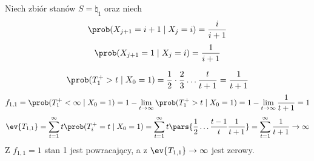 \begin{example}
	Niech zbiór stanów \(S = \natural_1\) oraz niech
	\[
		\prob(X_{j + 1} = i + 1 \mid X_j = i) = \frac{i}{i+1}
	\]
	\[
		\prob(X_{j + 1} = 1 \mid X_j = i) = \frac{1}{i+1}
	\]
	\begin{center}
	\end{center}

	\[
		\prob(T_1^+ > t \mid X_0 = 1) = \frac{1}{2} \cdot \frac{2}{3} \dots \frac{t}{t+1} = \frac{1}{t+1}
	\]
	\[
		f_{1, 1} = \prob(T_1^+ < \infty \mid X_0 = 1) = 1 - \lim_{t \to \infty} \prob(T_1^+ > t \mid X_0 = 1) = 1 - \lim_{t \to \infty} \frac{1}{t+1} = 1
	\]
	\[
		\ev{T_{1, 1}} = \sum_{t = 1}^\infty t \prob(T_i^+ = t \mid X_0 = 1) = \sum_{t = 1}^\infty t \pars{\frac{1}{2} \dots \frac{t-1}{t} \frac{1}{t+1}} = \sum_{t = 1}^\infty \frac{1}{t+1} \to \infty
	\]
	Z \(f_{1, 1} = 1\) stan 1 jest powracający, a z \(\ev{T_{1, 1}} \to \infty\) jest zerowy.
\end{example}

